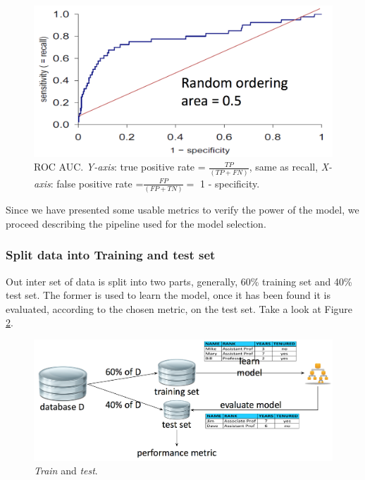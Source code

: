 \begin{figure}[H]%
 \centering
 \includegraphics[width=13cm]{./img/08/roc}
 \caption{\label{pic:roc} ROC AUC. \emph{Y-axis}: true positive rate = $\frac{TP}{(TP + FN)}$, same as recall, \emph{X-axis}: false positive rate =$\frac{FP}{(FP + TN)} =$ 1 - specificity.}
\end{figure}

Since we have presented some usable metrics to verify the power of the model, we proceed describing the pipeline used for the model selection.

\subsubsection*{Split data into Training and test set}

Out inter set of data is split into two parts, generally, 60\% training set and 40\% test set. The former is used to learn the model, once it has been found it is evaluated, according to the chosen metric, on the test set. Take a look at Figure \ref{pic:train_test}.

\begin{figure}[H]%
 \centering
 \includegraphics[width=13cm]{./img/08/train_test}
 \caption{\label{pic:train_test} \emph{Train} and \emph{test}.}
\end{figure}

